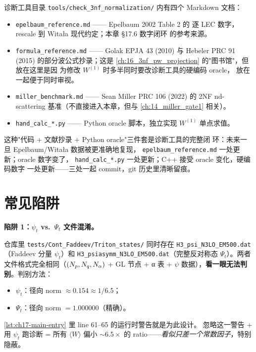 诊断工具目录 \texttt{tools/check\_3nf\_normalization/} 内有四个 Markdown
文档：

\begin{itemize}
  \item \texttt{epelbaum\_reference.md} —— Epelbaum 2002 Table 2 的
        逐 LEC 数字，rescale 到 Witała 现代约定；本章 §17.6 数字闭环
        的参考来源。
  \item \texttt{formula\_reference.md} —— Golak EPJA 43 (2010) 与
        Hebeler PRC 91 (2015) 的部分波公式抄录；这是
        \cref{ch:16_3nf_pw_projection} 的"图书馆"，但放在这里是因
        为修改 \(W^{(1)}\) 时多半同时要改诊断工具的硬编码 oracle，
        放在一起便于同时审视。
  \item \texttt{miller\_benchmark.md} —— Sean Miller PRC 106 (2022) 的
        2NF nd-scattering 基准（不直接进入本章，但与 \cref{ch:14_miller_gate1}
        相关）。
  \item \texttt{hand\_calc\_*.py} —— Python oracle 脚本，独立实现
        \(W^{(1)}\) 单点求值。
\end{itemize}

这种"代码 + 文献抄录 + Python oracle"三件套是诊断工具的完整闭
环：未来一旦 Epelbaum/Witała 数据被更准确地复现，
\texttt{epelbaum\_reference.md} 一处更新；oracle 数字变了，
\texttt{hand\_calc\_*.py} 一处更新；C++ 接受 oracle 变化，硬编码数字
一处更新——三处一起 commit，git 历史里清晰留痕。

\section{常见陷阱}
\label{sec:ch17-pitfalls}

\begin{pitfallbox}[label={box:ch17-pitfall-psi-norm}]
\textbf{陷阱 1：\(\psi_t\) vs.\ \(\Psi_t\) 文件混淆。}

仓库里 \texttt{tests/Cont\_Faddeev/Triton\_states/} 同时存在
\texttt{H3\_psi\_N3LO\_EM500.dat}（Faddeev 分量 \(\psi_t\)）和
\texttt{H3\_psiasymm\_N3LO\_EM500.dat}（完整反对称态 \(\Psi_t\)）。两者
文件格式完全相同（\((N_p, N_q, N_\alpha)\) + GL 节点 + α 表 + \(\psi\)
数据），\textbf{看一眼无法判别}。判别方法：
\begin{itemize}
  \item \(\psi_t\)：径向 norm \(\approx 0.154 \approx 1/6.5\)；
  \item \(\Psi_t\)：径向 norm \(=1.000000\)（精确）。
\end{itemize}
\cref{lst:ch17-main-entry} 里 line 61--65 的运行时警告就是为此设计。
忽略这一警告 + 用 \(\psi_t\) 跑诊断 = 所有 \(\langle W\rangle\) 偏小
\(\sim 6.5\times\) 的 ratio——\emph{看似只差一个常数因子}，特别隐蔽。
\end{pitfallbox}

